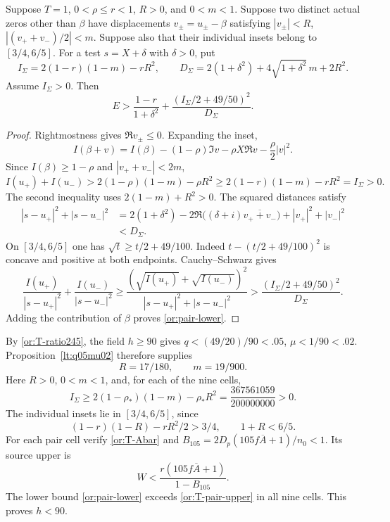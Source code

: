 \begin{lemma}\label{or:pair-source}
Suppose $T=1$, $0<\rho\le r<1$, $R>0$, and $0<m<1$.
Suppose two distinct actual zeros other than $\beta$ have
displacements $v_\pm=u_\pm-\beta$ satisfying
$|v_\pm|<R$, $|(v_++v_-)/2|<m$.  Suppose also that their individual
insets belong to $[3/4,6/5]$.  For a test
$s=X+\delta$ with $\delta>0$, put
\[
 I_\Sigma=2(1-r)(1-m)-rR^2,\qquad
 D_\Sigma=2(1+\delta^2)+4\sqrt{1+\delta^2}\,m+2R^2.
\]
Assume $I_\Sigma>0$.  Then
\begin{equation}\label{or:pair-lower}
        E>\frac{1-r}{1+\delta^2}
                    +\frac{(I_\Sigma/2+49/50)^2}{D_\Sigma}.
\end{equation}
\end{lemma}
\begin{proof}
Rightmostness gives $\Re v_\pm\le0$.  Expanding the inset,
\[
 I(\beta+v)=I(\beta)-(1-\rho)\Im v
                             -\rho X\Re v-\frac\rho2|v|^2.
\]
Since $I(\beta)\ge1-\rho$ and $|v_++v_-|<2m$,
\[
 I(u_+)+I(u_-)
 >2(1-\rho)(1-m)-\rho R^2
 \ge2(1-r)(1-m)-rR^2=I_\Sigma>0.
\]
The second inequality uses $2(1-m)+R^2>0$.
The squared distances satisfy
\[
 \begin{split}
 |s-u_+|^2+|s-u_-|^2
 &=2(1+\delta^2)
   -2\Re\bigl((\delta+i)\overline{v_++v_-}\bigr)
   +|v_+|^2+|v_-|^2\\
 &<D_\Sigma.
 \end{split}
\]
On $[3/4,6/5]$ one has $\sqrt t\ge t/2+49/100$.
Indeed $t-(t/2+49/100)^2$ is concave and positive at both endpoints.
Cauchy--Schwarz gives
\[
 \frac{I(u_+)}{|s-u_+|^2}+\frac{I(u_-)}{|s-u_-|^2}
 \ge\frac{(\sqrt{I(u_+)}+\sqrt{I(u_-)})^2}
              {|s-u_+|^2+|s-u_-|^2}
 >\frac{(I_\Sigma/2+49/50)^2}{D_\Sigma}.
\]
Adding the contribution of $\beta$ proves \eqref{or:pair-lower}.
\end{proof}

By \eqref{or:T-ratio245}, the field $h\ge90$ gives
$q<(49/20)/90<.05$, $\mu<1/90<.02$.
Proposition~\ref{lt:q05mu02} therefore supplies
\[
                          R=17/180,\qquad m=19/900.
\]
Here $R>0$, $0<m<1$, and, for each of the nine cells,
\[
 I_\Sigma\ge2(1-\rho_*)(1-m)-\rho_*R^2
             =\frac{367561059}{200000000}>0.
\]
The individual insets lie in $[3/4,6/5]$, since
\begin{equation}\label{or:pair-inset-gates}
          (1-r)(1-R)-rR^2/2>3/4,\qquad 1+R<6/5.
\end{equation}
For each pair cell verify \eqref{or:T-Abar} and
$B_{105}=2D_p(105f\overline A+1)/n_0<1$.  Its source upper is
\begin{equation}\label{or:T-pair-upper}
                  W<\frac{r(105f\overline A+1)}{1-B_{105}}.
\end{equation}
The lower bound \eqref{or:pair-lower} exceeds
\eqref{or:T-pair-upper} in all nine cells.  This proves $h<90$.

